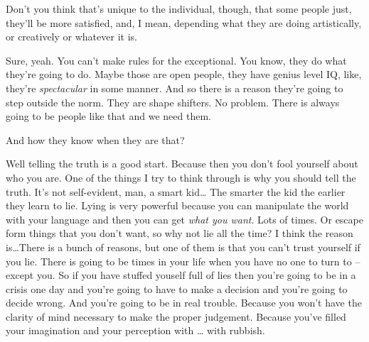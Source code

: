 \documentclass{memoir}
\begin{document}
\begin{drama}
		\jrspeaks Don't you think that's unique to the individual, though, that some people just, they'll be more satisfied, and, I mean, depending what they are doing artistically, or creatively or whatever it is.

		\jpspeaks Sure, yeah. You can't make rules for the exceptional. You know, they do what they're going to do. Maybe those are open people, they have genius level IQ, like, they're \emph{spectacular} in some manner. And so there is a reason they're going to step outside the norm. They are shape shifters. No problem. There is always going to be people like that and we need them.

		\jrspeaks And how they know when they are that?

		\jpspeaks Well telling the truth is a good start. Because then you don't fool yourself about who you are. One of the things I try to think through is why you should tell the truth. It's not self-evident, man, a smart kid\ldots{} The smarter the kid the earlier they learn to lie. Lying is very powerful because you can manipulate the world with your language and then you can get \emph{what you want}. Lots of times. Or escape form things that you don't want, so why not lie all the time? I think the reason is\ldots There is a bunch of reasons, but one of them is that you can't trust yourself if you lie. There is going to be times in your life when you have no one to turn to -- except you. So if you have stuffed youself full of lies then you're going to be in a crisis one day and you're going to have to make a decision and you're going to decide wrong. And you're going to be in real trouble. Because you won't have the clarity of mind necessary to make the proper judgement. Because you've filled your imagination and your perception with \ldots{} with rubbish.


\end{drama}
\end{document}
